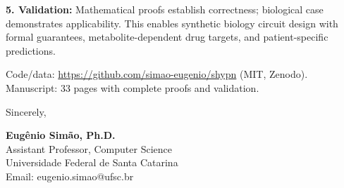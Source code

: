 \documentclass[11pt,letterpaper]{article}
\begin{document}
\textbf{5. Validation:} Mathematical proofs establish correctness; biological case demonstrates applicability. This enables synthetic biology circuit design with formal guarantees, metabolite-dependent drug targets, and patient-specific predictions.

Code/data: \url{https://github.com/simao-eugenio/shypn} (MIT, Zenodo). Manuscript: 33 pages with complete proofs and validation.

\vspace{6pt}

\noindent
Sincerely,

\vspace{12pt}

\noindent
\textbf{Eugênio Simão, Ph.D.}\\
Assistant Professor, Computer Science\\
Universidade Federal de Santa Catarina\\
Email: eugenio.simao@ufsc.br
\end{document}
